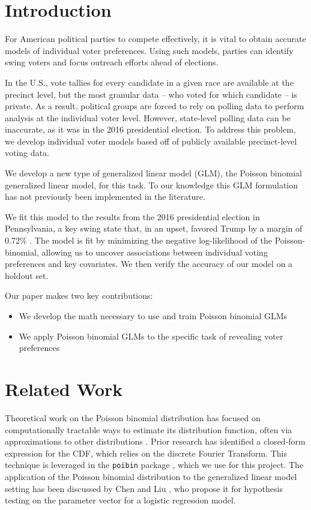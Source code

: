 \documentclass[10pt, letterpaper]{article}
\begin{document}
\begin{multicols}{2}

\section{Introduction}
For American political parties to compete effectively, it is vital to obtain accurate models of individual voter preferences. Using such models, parties can identify swing voters and focus outreach efforts ahead of elections. 

In the U.S., vote tallies for every candidate in a given race are available at the precinct level, but the most granular data -- who voted for which candidate -- is private. As a result, political groups are forced to rely on polling data to perform analysis at the individual voter level. However, state-level polling data can be inaccurate, as it was in the 2016 presidential election. To address this problem, we develop individual voter models based off of publicly available precinct-level voting data.

We develop a new type of generalized linear model (GLM), the Poisson binomial generalized linear model, for this task. To our knowledge this GLM formulation has not previously been implemented in the literature. 

We fit this model to the results from the 2016 presidential election in Pennsylvania, a key swing state that, in an upset, favored Trump by a margin of 0.72\% \cite{NYT}. The model is fit by minimizing the negative log-likelihood of the Poisson-binomial, allowing us to uncover associations between individual voting preferences and key covariates. We then verify the accuracy of our model on a holdout set. 

Our paper makes two key contributions:
\begin{itemize}[noitemsep]
	\item We develop the math necessary to use and train Poisson binomial GLMs
	\item We apply Poisson binomial GLMs to the specific task of revealing voter preferences
\end{itemize}

\section{Related Work}
Theoretical work on the Poisson binomial distribution has focused on computationally tractable ways to estimate its distribution function, often via approximations to other distributions 
\cite{EHM19917, roos1999, chen1974}. Prior research \cite{HONG201341} has identified a closed-form expression for the CDF, which relies on the discrete Fourier Transform. This technique is leveraged in the \texttt{poibin} package \cite{PoibiGithub}, which we use for this project. The application of the Poisson binomial distribution to the generalized linear model setting has been discussed by Chen and Liu \cite{Poibi}, who propose it for hypothesis testing on the parameter vector for a logistic regression model. 


\end{multicols}
\end{document}
